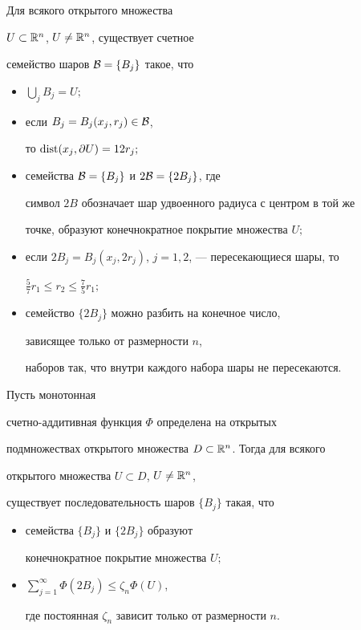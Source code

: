 \begin{lem}


Для всякого открытого множества


$U\subset {\Bbb R}^n$, $U\ne{\Bbb R}^n$, существует счетное


семейство шаров ${\cal B}=\{B_j\}$ такое, что


\begin{itemize}


\item[1)] $\bigcup\limits_{j}B_j=U;$


\item[2)] если $B_j=B_j(x_j,r_j)\in\cal B$,


то $\operatorname{dist}(x_j,\partial U)=12r_j;$


\item[3)] семейства ${\cal B}=\{B_j\}$ и $2{\cal B}=\{2B_j\}$, где


символ $2B$ обозначает шар удвоенного радиуса с центром в той же


точке, образуют конечнократное покрытие множества $U;$


\item[4)] если $2B_j=B_j(x_j,2r_j)$, $j=1,2$, --- пересекающиеся шары, то


$\frac{5}{7}r_1\leq r_2\leq\frac{7}{5}r_1;$


\item[5)] семейство $\{2B_j\}$ можно разбить на конечное число, 


зависящее только от размерности $n$,


наборов так, что внутри каждого набора шары не пересекаются.


\end{itemize}


\end{lem}





\begin{lem}


Пусть монотонная


счетно-аддитивная функция $\Phi$ определена на открытых


подмножествах открытого множества $D\subset {\Bbb R}^n$. Тогда для всякого


открытого множества $U\subset D$, $U\ne{\Bbb R}^n$,


существует последовательность шаров $\{B_j\}$ такая, что


\begin{itemize}


\item[1)] семейства $\{B_j\}$ и $\{2B_j\}$ образуют


конечнократное покрытие множества $U;$


\item[2)] $\sum\limits_{j=1}^{\infty}\Phi(2B_j)\leq \zeta_n\Phi(U)$,


где постоянная $\zeta_n$ зависит только от размерности $n$.


\end{itemize}


\end{lem}





